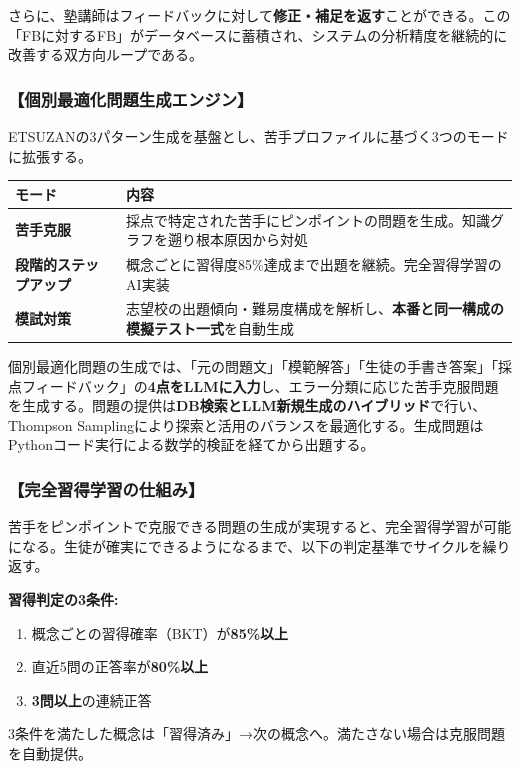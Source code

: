 \documentclass[paper=a4,fontsize=10.5bp,jafontsize=10.5bp,twocolumn]{jlreq}
\begin{document}
さらに、塾講師はフィードバックに対して\textbf{修正・補足を返す}ことができる。この「FBに対するFB」がデータベースに蓄積され、システムの分析精度を継続的に改善する双方向ループである。

\subsubsection{【個別最適化問題生成エンジン】}

ETSUZANの3パターン生成を基盤とし、苦手プロファイルに基づく3つのモードに拡張する。

\begin{footnotesize}\noindent
\begin{tabularx}{\linewidth}{>{\bfseries}l X}
\toprule
モード & 内容 \\
\midrule
苦手克服 & 採点で特定された苦手にピンポイントの問題を生成。知識グラフを遡り根本原因から対処 \\
段階的ステップアップ & 概念ごとに習得度85\%達成まで出題を継続。完全習得学習のAI実装 \\
模試対策 & 志望校の出題傾向・難易度構成を解析し、\textbf{本番と同一構成の模擬テスト一式}を自動生成 \\
\bottomrule
\end{tabularx}
\end{footnotesize}

個別最適化問題の生成では、「元の問題文」「模範解答」「生徒の手書き答案」「採点フィードバック」の\textbf{4点をLLMに入力}し、エラー分類に応じた苦手克服問題を生成する。問題の提供は\textbf{DB検索とLLM新規生成のハイブリッド}で行い、Thompson Samplingにより探索と活用のバランスを最適化する。生成問題はPythonコード実行による数学的検証を経てから出題する。

\subsubsection{【完全習得学習の仕組み】}

苦手をピンポイントで克服できる問題の生成が実現すると、完全習得学習が可能になる。生徒が確実にできるようになるまで、以下の判定基準でサイクルを繰り返す。

\begin{graybox}
\textbf{習得判定の3条件:}
\begin{enumerate}[leftmargin=1.5em]
  \item 概念ごとの習得確率（BKT）が\textbf{85\%以上}
  \item 直近5問の正答率が\textbf{80\%以上}
  \item \textbf{3問以上}の連続正答
\end{enumerate}
3条件を満たした概念は「習得済み」→次の概念へ。満たさない場合は克服問題を自動提供。
\end{graybox}
\end{document}
